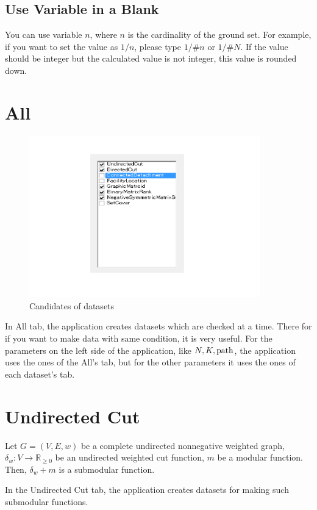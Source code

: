 \documentclass{article}
\newcommand{\re}{\mathbb{R}}
\newcommand{\exTab}[1]{
In the #1 tab,
the application creates datasets for making such submodular functions.}
\begin{document}
\subsection{Use Variable in a Blank}
You can use variable $n$, where $n$ is the cardinality of the ground set.
For example, if you want to set the value as $1/n$,
please type $1/\#n$ or $1/\#N$.
If the value should be integer but the calculated value is not integer,
this value is rounded down.

\newpage

\section{All}\label{allSec}

\begin{figure}[h!]\label{allPic}
{
\fontsize{10pt}{12pt}\selectfont
\centering
\includegraphics[height=7.0cm]{picture/all.png}
\caption{Candidates of datasets}
}
\end{figure}
In All tab,
the application creates datasets which are checked at a time.
There for if you want to make data with same condition,
it is very useful.
For the parameters on the left side of the application, like $N,K,{\rm path}$, 
the application uses the ones of the All's tab,
but for the other parameters it uses the ones of each dataset's tab.

\newpage

\section{Undirected Cut}\label{undirectedCutSec}
Let $G=(V,E,w)$ be a complete undirected nonnegative weighted graph,
$\delta_w :V\rightarrow \re_{\geq 0}$ be an undirected weighted cut function,
$m$ be a modular function.
Then, $\delta_w + m$ is a submodular function.
\exTab{Undirected Cut}
\end{document}
